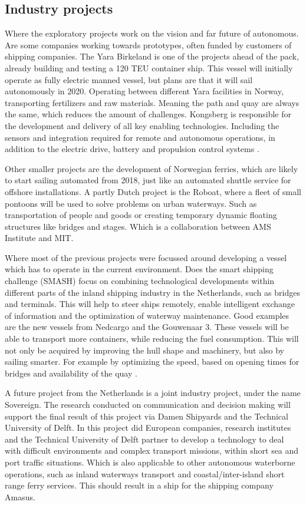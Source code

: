 \subsection{Industry projects}
Where the exploratory projects work on the vision and far future of autonomous. Are some companies working towards prototypes, often funded by customers of shipping companies.
The Yara Birkeland is one of the projects ahead of the pack, already building and testing a 120 \ac{TEU} container ship. This vessel will initially operate as fully electric manned vessel, but plans are that it will sail autonomously in 2020. Operating between different Yara facilities in Norway, transporting fertilizers and raw materials. Meaning the path and quay are always the same, which reduces the amount of challenges.
Kongsberg is responsible for the development and delivery of all key enabling technologies. Including the sensors and integration required for remote and autonomous operations, in addition to the electric drive, battery and propulsion control systems \cite{Sames2017}.

Other smaller projects are the development of Norwegian ferries, which are likely to start sailing automated from 2018, just like an automated shuttle service for offshore installations. A partly Dutch project is the Roboat, where a fleet of small pontoons will be used to solve problems on urban waterways. Such as transportation of people and goods or creating temporary dynamic floating structures like bridges and stages. Which is a collaboration between AMS Institute and MIT.

Where most of the previous projects were focussed around developing a vessel which has to operate in the current environment. Does the smart shipping challenge (SMASH) focus on combining technological developments within different parts of the inland shipping industry in the Netherlands, such as bridges and terminals. This will help to steer ships remotely, enable intelligent exchange of information and the optimization of waterway maintenance.
Good examples are the new vessels from Nedcargo and the Gouwenaar 3. These vessels will be able to transport more containers, while reducing the fuel consumption. This will not only be acquired by improving the hull shape and machinery, but also by sailing smarter. For example by optimizing the speed, based on opening times for bridges and availability of the quay \cite{SMASH2017}. 

A future project from the Netherlands is a joint industry project, under the name Sovereign. The research conducted on communication and decision making will support the final result of this project via Damen Shipyards and the Technical University of Delft. In this project did European companies, research institutes and the Technical University of Delft partner to develop a technology to deal with difficult environments and complex transport missions, within short sea and port traffic situations. Which is also applicable to other autonomous waterborne operations, such as inland waterways transport and coastal/inter-island short range ferry services. This should result in a ship for the shipping company Amasus.

